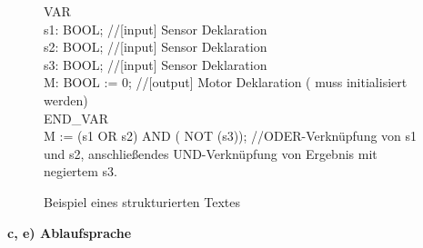 	\begin{figure}[h]
		\begin{framed}
		\color{black}
		VAR\\
		s1: BOOL; \color{gray}//[input] Sensor Deklaration\\ \color{black}
		s2: BOOL; \color{gray}//[input] Sensor Deklaration\\ \color{black}
		s3: BOOL; \color{gray}//[input] Sensor Deklaration\\ \color{black}
		M: BOOL := 0; \color{gray}//[output] Motor Deklaration ( muss initialisiert werden)\\ \color{black}
		END\_VAR\\
		M := (s1 OR s2) AND ( NOT (s3)); \color{gray}//ODER-Verknüpfung von s1 und s2, anschließendes UND-Verknüpfung von Ergebnis mit negiertem s3.\
		\end{framed}
		\caption{Beispiel eines strukturierten Textes}
		\label{fig:StructuredText}
	\end{figure}
	
	\color{black}
	\textbf{c, e) Ablaufsprache}\\
	
